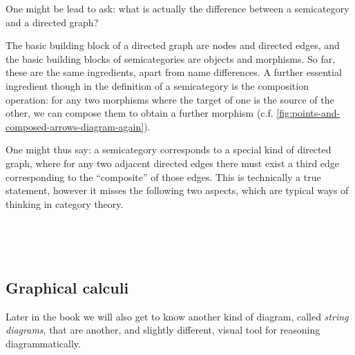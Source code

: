 
One might be lead to ask: what is actually the difference between a semicategory and a directed graph? 

The basic building block of a directed graph are nodes and directed edges, and the basic building blocks of semicategories are objects and morphisms. So far, these are the same ingredients, apart from name differences. A further essential ingredient though in the definition of a semicategory is the composition operation: for any two morphisms where the target of one is the source of the other, we can compose them to obtain a further morphism (c.f. \cref{fig:points-and-composed-arrows-diagram-again}). 

\begin{marginfigure}
    \centering
    \caption{}
    \label{fig:points-and-composed-arrows-diagram-again}
\end{marginfigure}

One might thus say: a semicategory corresponds to a special kind of directed graph, where for any two adjacent directed edges there must exist a third edge corresponding to the ``composite'' of those edges. This is technically a true statement, however it misses the following two aspects, which are typical ways of thinking in category theory.  







\

\

\subsection{Graphical calculi}



Later in the book we will also get to know another kind of diagram, called \emph{string diagrams}, that are another, and slightly different, visual tool for reasoning diagrammatically.



